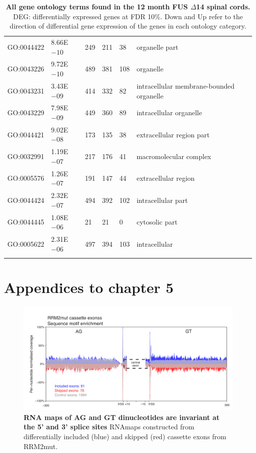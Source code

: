 \begin{longtable}{| p{} | p{} |p{} | p{} |p{} | p{} |}
		GO:0044422 & 8.66E$-10$ & 249 & 211 & 38 & organelle part \\ 
		GO:0043226 & 9.72E$-10$ & 489 & 381 & 108 & organelle \\ 
		GO:0043231 & 3.43E$-09$ & 414 & 332 & 82 & intracellular membrane-bounded organelle \\ 
		GO:0043229 & 7.98E$-09$ & 449 & 360 & 89 & intracellular organelle \\ 
		GO:0044421 & 9.02E$-08$ & 173 & 135 & 38 & extracellular region part \\ 
		GO:0032991 & 1.19E$-07$ & 217 & 176 & 41 & macromolecular complex \\ 
		GO:0005576 & 1.26E$-07$ & 191 & 147 & 44 & extracellular region \\ 
		GO:0044424 & 2.32E$-07$ & 494 & 392 & 102 & intracellular part \\ 
		GO:0044445 & 1.08E$-06$ & 21 & 21 & 0 & cytosolic part \\ 
		GO:0005622 & 2.31E$-06$ & 497 & 394 & 103 & intracellular \\ 
		\hline 
	\caption[All gene ontology terms found in the 12 month FUS $\Delta$14 spinal cords.]{
		\textbf{All gene ontology terms found in the 12 month FUS $\Delta$14 spinal cords.} DEG: differentially expressed genes at FDR 10\%. Down and Up refer to the direction of differential gene expression of the genes in each ontology category.
	} 
	\label{append:d14_spinal_go} 
\end{longtable} 

\clearpage

\section{Appendices to  chapter 5 }

\begin{figure}[h]
	\centering
	\includegraphics[width=14cm]{Figures/05_tdp_mice/RNAmap_motif_AG_GT_RRM2mut.png}
	\caption[RNA maps of AG and GT dinucleotides are invariant at the 5' and 3' splice sites]{
		\textbf{RNA maps of AG and GT dinucleotides are invariant at the 5' and 3' splice sites}
	RNAmaps constructed from differentially included (blue) and skipped (red) cassette exons from RRM2mut.
}
	\label{fig:RNAmap_splicing}
\end{figure}


